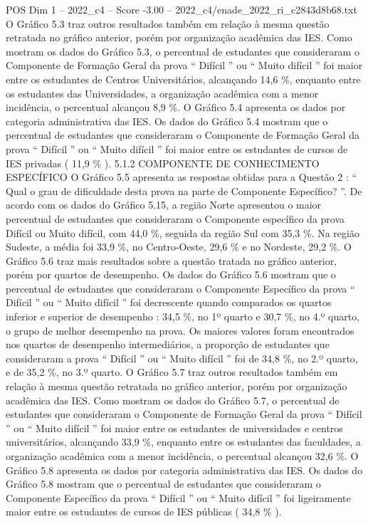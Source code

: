 \begin{textsample}{POS Dim 1 – 2022\_c4 – Score -3.00 – 2022\_c4/enade\_2022\_ri\_c2843d8b68.txt}
O Gráfico 5.3 traz outros resultados também em relação à mesma questão retratada no gráfico anterior, porém por organização acadêmica das IES.
Como mostram os dados do Gráfico 5.3, o percentual de estudantes que consideraram o Componente de Formação Geral da prova “ Difícil ” ou “ Muito difícil ” foi maior entre os estudantes de Centros Universitários, alcançando 14,6 \%, enquanto entre os estudantes das Universidades, a organização acadêmica com a menor incidência, o percentual alcançou 8,9 \%.
O Gráfico 5.4 apresenta os dados por categoria administrativa das IES.
Os dados do Gráfico 5.4 mostram que o percentual de estudantes que consideraram o Componente de Formação Geral da prova “ Difícil ” ou “ Muito difícil ” foi maior entre os estudantes de cursos de IES privadas ( 11,9 \% ). 5.1.2 COMPONENTE DE CONHECIMENTO ESPECÍFICO O Gráfico 5.5 apresenta as respostas obtidas para a Questão 2 : “ Qual o grau de dificuldade desta prova na parte de Componente Específico? ”.
De acordo com os dados do Gráfico 5.15, a região Norte apresentou o maior percentual de estudantes que consideraram o Componente específico da prova Difícil ou Muito difícil, com 44,0 \%, seguida da região Sul com 35,3 \%.
Na região Sudeste, a média foi 33,9 \%, no Centro-Oeste, 29,6 \% e no Nordeste, 29,2 \%.
O Gráfico 5.6 traz mais resultados sobre a questão tratada no gráfico anterior, porém por quartos de desempenho.
Os dados do Gráfico 5.6 mostram que o percentual de estudantes que consideraram o Componente Específico da prova “ Difícil ” ou “ Muito difícil ” foi decrescente quando comparados os quartos inferior e superior de desempenho : 34,5 \%, no 1º quarto e 30,7 \%, no 4.º quarto, o grupo de melhor desempenho na prova.
Os maiores valores foram encontrados nos quartos de desempenho intermediários, a proporção de estudantes que consideraram a prova “ Difícil ” ou “ Muito difícil ” foi de 34,8 \%, no 2.º quarto, e de 35,2 \%, no 3.º quarto.
O Gráfico 5.7 traz outros resultados também em relação à mesma questão retratada no gráfico anterior, porém por organização acadêmica das IES.
Como mostram os dados do Gráfico 5.7, o percentual de estudantes que consideraram o Componente de Formação Geral da prova “ Difícil ” ou “ Muito difícil ” foi maior entre os estudantes de universidades e centros universitários, alcançando 33,9 \%, enquanto entre os estudantes das faculdades, a organização acadêmica com a menor incidência, o percentual alcançou 32,6 \%.
O Gráfico 5.8 apresenta os dados por categoria administrativa das IES.
Os dados do Gráfico 5.8 mostram que o percentual de estudantes que consideraram o Componente Específico da prova “ Difícil ” ou “ Muito difícil ” foi ligeiramente maior entre os estudantes de cursos de IES públicas ( 34,8 \% ).

\end{textsample}
